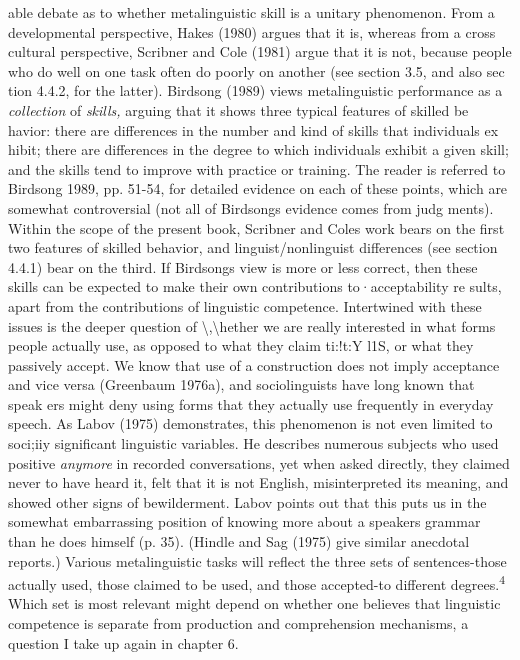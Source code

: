 \begin{styleTextbody}
able debate as to whether metalinguistic skill is a unitary phenomenon. From a developmental perspective, Hakes (1980) argues that it is, whereas from a cross\- cultural perspective, Scribner and Cole (1981) argue that it is not, because people who do well on one task often do poorly on another (see section 3.5, and also sec\- tion 4.4.2, for the latter). Birdsong (1989) views metalinguistic performance as a \textit{collection}\textit{ }of \textit{skills,}\textit{ }arguing that it shows three typical features of skilled be\- havior: there are differences in the number and kind of skills that individuals ex\- hibit; there are differences in the degree to which individuals exhibit a given skill; and the skills tend to improve with practice or training. The reader is referred to Birdsong 1989, pp. 51-54, for detailed evidence on each of these points, which are somewhat controversial (not all of Birdsong{\textquotesingle}s evidence comes from judg\- ments). Within the scope of the present book, Scribner and Cole{\textquotesingle}s work bears on the first two features of skilled behavior, and linguist/nonlinguist differences (see section 4.4.1) bear on the third. If Birdsong{\textquotesingle}s view is more or less correct, then these skills can be expected to make their own contributions to·acceptability re\- sults, apart from the contributions of linguistic competence. Intertwined with these issues is the deeper question of {\textbackslash},{\textbackslash}{\textquotesingle}hether we are really interested in what forms people actually use, as opposed to what they claim ti:!t:Y l1S, or what they passively accept. We know that use of a construction does not imply acceptance and vice versa (Greenbaum 1976a), and sociolinguists have long known that speak\- ers might deny using forms that they actually use frequently in everyday speech. As Labov (1975) demonstrates, this phenomenon is not even limited to soci;iiy significant linguistic variables. He describes numerous subjects who used positive \textit{anymore}\textit{ }in recorded conversations, yet when asked directly, they claimed never to have heard it, felt that it is not English, misinterpreted its meaning, and showed other signs of bewilderment. Labov points out that {\textquotedbl}this puts us in the somewhat embarrassing position of knowing more about a speaker{\textquotesingle}s grammar than he does himself {\textquotesingle} (p. 35). (Hindle and Sag (1975) give similar anecdotal reports.) Various metalinguistic tasks will reflect the three sets of sentences-those actually used, those claimed to be used, and those accepted-to different degrees.\textsuperscript{4}\textsuperscript{ }Which set is most relevant might depend on whether one believes that linguistic competence is separate from production and comprehension mechanisms, a question I take up again in chapter 6.
\end{styleTextbody}


